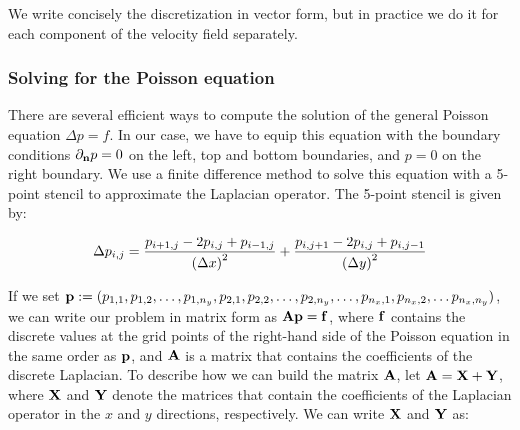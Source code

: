 We write concisely the discretization in vector form, but in practice we do it for each component of the velocity field separately.

\subsubsection*{Solving for the Poisson equation}\label{sec: solvingPoisson}
There are several efficient ways to compute the solution of the general Poisson equation $\Delta p = f$. In our case, we have to equip this equation with the boundary conditions $\partial_{\boldsymbol{\mathrm{n}}}p=0$ on the left, top and bottom boundaries, and $p=0$ on the right boundary. We use a finite difference method to solve this equation with a 5-point stencil to approximate the Laplacian operator. The 5-point stencil is given by:

\begin{equation*}
  \Delta p_{i,j} = \frac{p_{i+1,j} - 2 p_{i,j} + p_{i-1,j}}{{(\Delta x)}^2} + \frac{p_{i,j+1} - 2 p_{i,j} + p_{i,j-1}}{{(\Delta y)}^2}
\end{equation*}

If we set $\boldsymbol{\mathrm{p}}:=(p_{1,1}, p_{1,2}, \ldots, p_{1,n_y}, p_{2,1}, p_{2,2}, \ldots, p_{2,n_y},\ldots, p_{n_x,1},p_{n_x,2},\ldots p_{n_x,n_y})$, we can write our problem in matrix form as $\boldsymbol{\mathrm{A}}\boldsymbol{\mathrm{p}}=\boldsymbol{\mathrm{f}}$, where $\boldsymbol{\mathrm{f}}$ contains the discrete values at the grid points of the right-hand side of the Poisson equation in the same order as $\boldsymbol{\mathrm{p}}$, and $\boldsymbol{\mathrm{A}}$ is a matrix that contains the coefficients of the discrete Laplacian. To describe how we can build the matrix $\boldsymbol{\mathrm{A}}$, let $\boldsymbol{\mathrm{A}}=\boldsymbol{\mathrm{X}} + \boldsymbol{\mathrm{Y}}$, where $\boldsymbol{\mathrm{X}}$ and $\boldsymbol{\mathrm{Y}}$ denote the matrices that contain the coefficients of the Laplacian operator in the $x$ and $y$ directions, respectively. We can write $\boldsymbol{\mathrm{X}}$ and $\boldsymbol{\mathrm{Y}}$ as:

